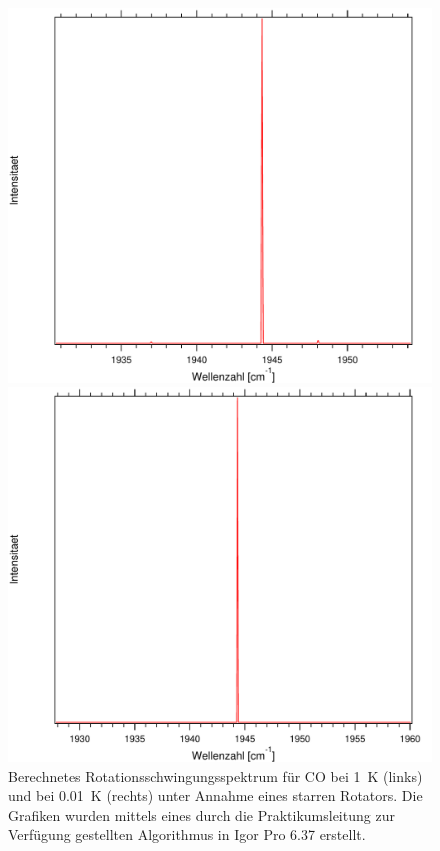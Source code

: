 \begin{figure}[H]
\centering	
	\begin{minipage}{0.47\linewidth}
	\includegraphics[width=\linewidth]{Bilder/1CO.pdf}
	
	\end{minipage}
\begin{minipage}{0.47\linewidth}
	\includegraphics[width=\linewidth]{Bilder/001CO.pdf}
	
	\end{minipage}
\caption{Berechnetes Rotationsschwingungsspektrum für CO bei 1~K (links) und bei 0.01~K (rechts) unter Annahme eines starren Rotators. Die Grafiken wurden mittels eines durch die Praktikumsleitung zur Verfügung gestellten Algorithmus in Igor Pro 6.37 erstellt.}
	\label{Rot:001CO}	
	
	
	
	
\end{figure}





